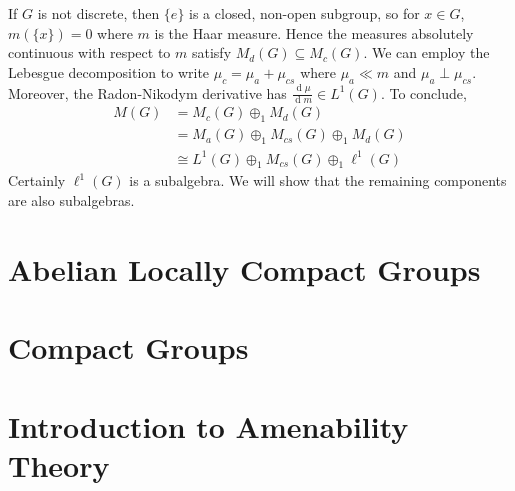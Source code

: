 \documentclass[11pt, a4paper]{memoir}
\theoremstyle{change}
\theoremstyle{plain}
\theoremstyle{nonumberplain}
\renewcommand{\d}[1]{\ensuremath{\operatorname{d}\!{#1}}}
\numberwithin{equation}{section}
\begin{document}
If $G$ is not discrete, then $\{e\}$ is a closed, non-open subgroup, so for $x\in G$, $m(\{x\})=0$ where $m$ is the Haar measure.
Hence the measures absolutely continuous with respect to $m$ satisfy $M_d(G)\subseteq M_c(G)$.
We can employ the Lebesgue decomposition to write $\mu_c=\mu_a+\mu_{cs}$ where $\mu_a\ll m$ and $\mu_a\perp \mu_{cs}$.
Moreover, the Radon-Nikodym derivative has $\frac{\d{\mu}}{\d{m}}\in L^1(G)$.
To conclude,
\begin{align*}
    M(G) &= M_c(G)\oplus_1 M_d(G)\\
         &= M_a(G)\oplus_1 M_{cs}(G)\oplus_1 M_d(G)\\
         &\cong L^1(G)\oplus_1 M_{cs}(G)\oplus_1 \ell^1(G)
\end{align*}
Certainly $\ell^1(G)$ is a subalgebra.
We will show that the remaining components are also subalgebras.

\section{Abelian Locally Compact Groups}
\section{Compact Groups}
\section{Introduction to Amenability Theory}
\end{document}
